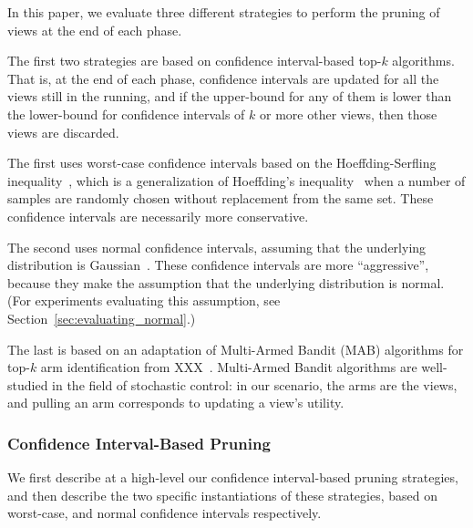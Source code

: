 In this paper, we evaluate three different strategies
to perform the pruning of views at the end of each phase.
\begin{denselist}
\item The first two strategies are based on confidence interval-based top-$k$ algorithms.
That is, at the end of each phase, confidence intervals are updated for all
the views still in the running, and if the upper-bound for any of them
is lower than the lower-bound for confidence intervals of $k$ or more other views,
then those views are discarded.
\begin{denselist}
\item The first uses worst-case confidence intervals based on the
Hoeff\-ding-Serfling inequality~\cite{serfling1974probability}, 
which is a generalization of Hoeffding's inequality~\cite{hoeffding1963probability}
when a number of samples are randomly chosen without replacement
from the same set.
These confidence intervals are necessarily more conservative.
\item The second uses normal confidence intervals, assuming that 
the underlying distribution is Gaussian~\cite{all-of-statistics}.
These confidence intervals are more ``aggressive'', because they make the assumption
that the underlying distribution is normal.
(For experiments evaluating this assumption, see Section~\ref{sec:evaluating_normal}.) 
\end{denselist}
\item The last is based on an adaptation of Multi-Armed Bandit (MAB) algorithms
for top-$k$ arm identification from XXX~\cite{}. 
Multi-Armed Bandit algorithms are well-studied in the field of stochastic control:
in our scenario, the arms are the views, and pulling an arm corresponds
to updating a view's utility.
\end{denselist}


\subsubsection{Confidence Interval-Based Pruning}
We first describe at a high-level our confidence interval-based pruning strategies,
and then describe the two specific instantiations of these strategies,
based on worst-case, and normal confidence intervals respectively.

